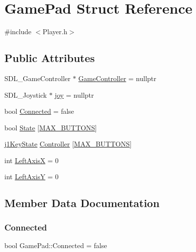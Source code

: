 \hypertarget{struct_game_pad}{}\section{Game\+Pad Struct Reference}
\label{struct_game_pad}


{\ttfamily \#include $<$Player.\+h$>$}

\subsection*{Public Attributes}
\begin{DoxyCompactItemize}
\item 
S\+D\+L\+\_\+\+Game\+Controller $\ast$ \mbox{\hyperlink{struct_game_pad_ab87bb39c4cafeac5c48f0949ef797912}{Game\+Controller}} = nullptr
\item 
S\+D\+L\+\_\+\+Joystick $\ast$ \mbox{\hyperlink{struct_game_pad_a7d310dbf80b7a7c97d3233b502576677}{joy}} = nullptr
\item 
bool \mbox{\hyperlink{struct_game_pad_ae6e9f0405888cb91406428fcfa5f5f4e}{Connected}} = false
\item 
bool \mbox{\hyperlink{struct_game_pad_ab80783d8ef33848055cdb3027f95305e}{State}} \mbox{[}\mbox{\hyperlink{_input_8h_a8bb0c7f312bb8665c3377a061dae552c}{M\+A\+X\+\_\+\+B\+U\+T\+T\+O\+NS}}\mbox{]}
\item 
\mbox{\hyperlink{_input_8h_aea34d794e9a93d93622f3600b7eaf229}{j1\+Key\+State}} \mbox{\hyperlink{struct_game_pad_abb86bc7ca17427e1e922c2852d1a6f33}{Controller}} \mbox{[}\mbox{\hyperlink{_input_8h_a8bb0c7f312bb8665c3377a061dae552c}{M\+A\+X\+\_\+\+B\+U\+T\+T\+O\+NS}}\mbox{]}
\item 
int \mbox{\hyperlink{struct_game_pad_a160c4f6acf35019ee7cdf98d42a71c47}{Left\+AxisX}} = 0
\item 
int \mbox{\hyperlink{struct_game_pad_a85ce6ae3baac970612a03f5dd8a281b1}{Left\+AxisY}} = 0
\end{DoxyCompactItemize}


\subsection{Member Data Documentation}
\mbox{\label{struct_game_pad_ae6e9f0405888cb91406428fcfa5f5f4e}} 
\subsubsection{\texorpdfstring{Connected}{Connected}}
{\footnotesize\ttfamily bool Game\+Pad\+::\+Connected = false}

